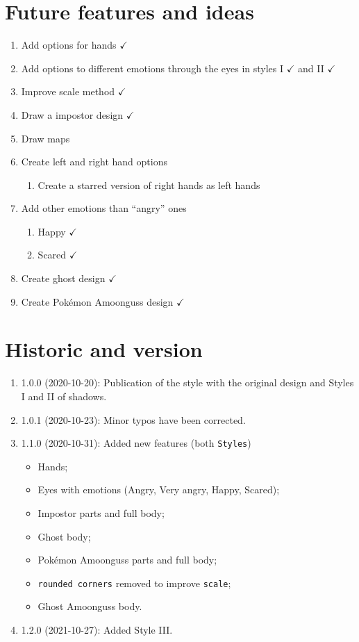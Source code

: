 \documentclass[12pt]{article}
\newenvironment{FHZtcbEnumerate}{%
  \begin{FHZboxEnumerateStyle}\begin{enumerate}}
    {\end{enumerate}\end{FHZboxEnumerateStyle}
}
\begin{document}
\section{Future features and ideas}

\begin{FHZtcbEnumerate}
  \item Add options for hands $\checkmark$
  \item Add options to different emotions through the eyes in styles I $\checkmark$ and II $\checkmark$
  \item Improve scale method $\checkmark$
  \item Draw a impostor design $\checkmark$
  \item Draw maps
  \item Create left and right hand options
  \begin{enumerate}
    \item Create a starred version of right hands as left hands
  \end{enumerate}
  \item Add other emotions than ``angry'' ones
  \begin{enumerate}
    \item Happy $\checkmark$
    \item Scared $\checkmark$
  \end{enumerate}
  \item Create ghost design $\checkmark$
  \item Create Pokémon Amoonguss design $\checkmark$
\end{FHZtcbEnumerate}

\section{Historic and version}

\begin{FHZtcbEnumerate}[leftmargin=3.5cm]
  \item[1.0.0 (2020-10-20):] Publication of the style with the original design and Styles I and II of shadows.
  \item[1.0.1 (2020-10-23):] Minor typos have been corrected.
  \item[1.1.0 (2020-10-31):] Added new features (both \texttt{Styles})
    \begin{itemize}[leftmargin=-2cm]
      \item Hands;
      \item Eyes with emotions (Angry, Very angry, Happy, Scared);
      \item Impostor parts and full body;
      \item Ghost body;
      \item Pokémon Amoonguss parts and full body;
      \item \texttt{rounded corners} removed to improve \texttt{scale};
      \item Ghost Amoonguss body.
    \end{itemize}

  \item[1.2.0 (2021-10-27):] Added Style III.
\end{FHZtcbEnumerate}
\end{document}
